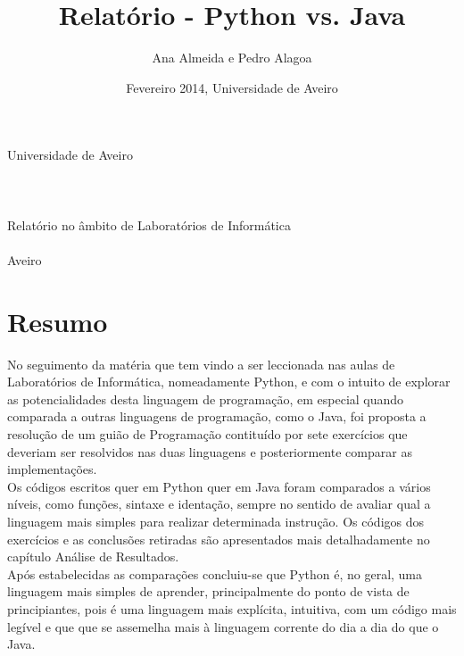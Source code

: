 \documentclass[a4paper]{report}
\title{Relatório - Python vs. Java}
\author{Ana Almeida e Pedro Alagoa}
\date{Fevereiro 2014, Universidade de Aveiro}
\begin{document}
\begin{flushleft}
\begin{center}
 \Large{Universidade de Aveiro}
 \\[150pt]
 \\[75pt]
 \\
 \\[200pt]
 \flushleft \Large Relatório no âmbito de Laboratórios de Informática
 \\
 \\
 Aveiro
\end{center} 

\maketitle

\begingroup
\hypersetup{linkcolor=black}
\tableofcontents
\endgroup
\clearpage

\cleardoublepage
{}
\begingroup
\hypersetup{linkcolor=black}


\cleardoublepage
{}
\listoffigures
\endgroup

\clearpage

\end{flushleft}

\section{Resumo}
\label{resumo}

No seguimento da matéria que tem vindo a ser leccionada nas aulas de Laboratórios de Informática, nomeadamente Python, e com o intuito de explorar as potencialidades desta linguagem de programação, em especial quando comparada a outras linguagens de programação, como o Java, foi proposta a resolução de um guião de Programação contituído por sete exercícios que deveriam ser resolvidos nas duas linguagens e posteriormente comparar as implementações. 
\\
Os códigos escritos quer em Python quer em Java foram comparados a vários níveis, como funções, sintaxe e identação, sempre no sentido de avaliar qual a linguagem mais simples para realizar determinada instrução. Os códigos dos exercícios e as conclusões retiradas são apresentados mais detalhadamente no capítulo Análise de Resultados. 
\\
Após estabelecidas as comparações concluiu-se que Python é, no geral, uma linguagem mais simples de aprender, principalmente do ponto de vista de principiantes, pois é uma linguagem mais explícita, intuitiva, com um código mais legível e que que se assemelha mais à linguagem corrente do dia a dia do que o Java.
\end{document}
